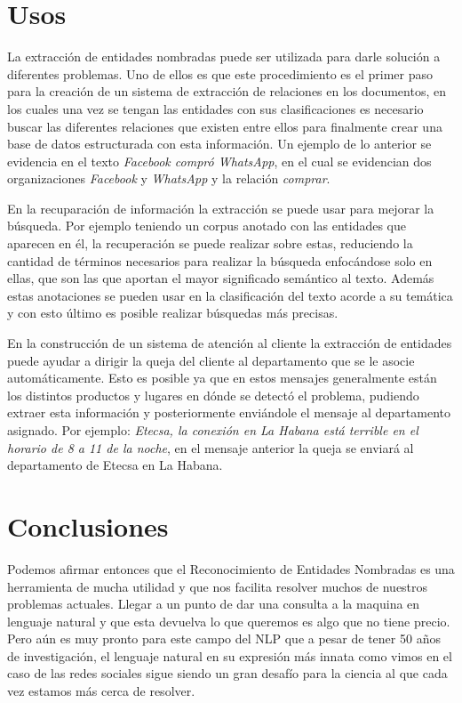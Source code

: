 \documentclass[runningheads]{llncs}
\begin{document}
\section{Usos}

La extracción de entidades nombradas puede ser utilizada para darle solución a diferentes problemas. Uno de ellos es que este procedimiento es el primer paso para la creación de un sistema de extracción de relaciones en los documentos, en los cuales una vez se tengan las entidades con sus clasificaciones es necesario buscar las diferentes relaciones que existen entre ellos para finalmente crear una base de datos estructurada con esta información. Un ejemplo de lo anterior se evidencia en el texto \emph{Facebook compró WhatsApp}, en el cual se evidencian dos organizaciones \emph{Facebook} y \emph{WhatsApp} y la relación \emph{comprar}.

En la recuparación de información la extracción se puede usar para mejorar la búsqueda. Por ejemplo teniendo un corpus anotado con las entidades que aparecen en él, la recuperación se puede realizar sobre estas, reduciendo la cantidad de términos necesarios para realizar la búsqueda enfocándose solo en ellas, que son las que aportan el mayor significado semántico al texto. Además estas anotaciones se pueden usar en la clasificación del texto acorde a su temática y con esto último es posible realizar búsquedas más precisas.

En la construcción de un sistema de atención al cliente la extracción de entidades puede ayudar a dirigir la queja del cliente al departamento que se le asocie automáticamente. Esto es posible ya que en estos mensajes generalmente están los distintos productos y lugares en dónde se detectó el problema, pudiendo extraer esta información y posteriormente enviándole el mensaje al departamento asignado. Por ejemplo: \emph{Etecsa, la conexión en La Habana está terrible en el horario de 8 a 11 de la noche}, en el mensaje anterior la queja se enviará al departamento de Etecsa en La Habana.


\section{Conclusiones}


Podemos afirmar entonces que el Reconocimiento de Entidades Nombradas es una herramienta de mucha utilidad y que nos facilita resolver muchos de nuestros problemas actuales. Llegar a un punto de dar una consulta a la maquina en lenguaje natural y que esta devuelva lo que queremos es algo que no tiene precio. Pero aún es muy pronto para este campo del NLP que a pesar de tener 50 años de investigación, el lenguaje natural en su expresión más innata como vimos en el caso de las redes sociales sigue siendo un gran desafío para la ciencia al que cada vez estamos más cerca de resolver.
\end{document}
